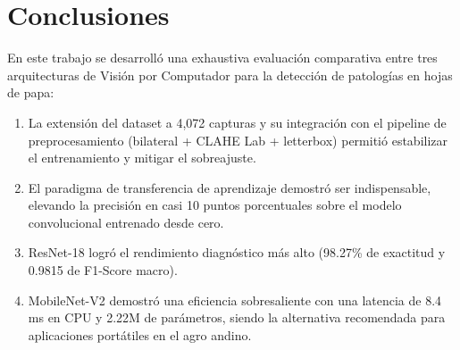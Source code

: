 \documentclass[10pt,a4paper,twoside]{article}
\begin{document}
\section{Conclusiones}
En este trabajo se desarrolló una exhaustiva evaluación comparativa entre tres arquitecturas de Visión por Computador para la detección de patologías en hojas de papa:
\begin{enumerate}
    \item La extensión del dataset a 4,072 capturas y su integración con el pipeline de preprocesamiento (bilateral + CLAHE Lab + letterbox) permitió estabilizar el entrenamiento y mitigar el sobreajuste.
    \item El paradigma de transferencia de aprendizaje demostró ser indispensable, elevando la precisión en casi 10 puntos porcentuales sobre el modelo convolucional entrenado desde cero.
    \item ResNet-18 logró el rendimiento diagnóstico más alto (98.27\% de exactitud y 0.9815 de F1-Score macro).
    \item MobileNet-V2 demostró una eficiencia sobresaliente con una latencia de 8.4 ms en CPU y 2.22M de parámetros, siendo la alternativa recomendada para aplicaciones portátiles en el agro andino.
\end{enumerate}



\end{document}
